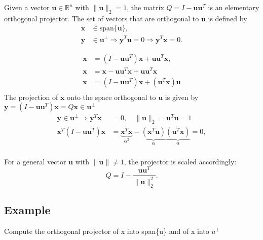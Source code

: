 Given a vector \( \mathbf{u} \in \mathbb{R}^n \) with \( \| \mathbf{u} \|_2 = 1 \), the matrix \( Q = I - \mathbf{u}\mathbf{u}^T \) is an elementary orthogonal projector. The set of vectors that are orthogonal to \( \mathbf{u} \) is defined by
\begin{align*}
\mathbf{x} &\in \text{span}\{ \mathbf{u} \}, \\
\mathbf{y} &\in \mathbf{u}^\perp \Rightarrow \mathbf{y}^T\mathbf{u} = 0 \Rightarrow \mathbf{y}^T\mathbf{x} = 0.
\end{align*}

\begin{align*}
\mathbf{x} &= (I - \mathbf{u}\mathbf{u}^T)\mathbf{x} + \mathbf{u}\mathbf{u}^T\mathbf{x}, \\
\mathbf{x} &= \mathbf{x}  - \mathbf{u}\mathbf{u}^T\mathbf{x} + \mathbf{u}\mathbf{u}^T\mathbf{x} \\
\mathbf{x} &= (I - \mathbf{u}\mathbf{u}^T)\mathbf{x} + (\mathbf{u}^T\mathbf{x})\mathbf{u} \\
\end{align*}
The projection of \( \mathbf{x} \) onto the space orthogonal to \( \mathbf{u} \) is given by \( \mathbf{y} = (I - \mathbf{u}\mathbf{u}^T)\mathbf{x} = Q\mathbf{x} \in \mathbf{u}^\perp \)
\begin{align*}
\mathbf{y} \in \mathbf{u}^\perp \Rightarrow \mathbf{y}^T \mathbf{x} &= 0, \quad \| \mathbf{u} \|_2 = \mathbf{u}^T\mathbf{u} = 1 \\
\mathbf{x}^T(I - \mathbf{u}\mathbf{u}^T)\mathbf{x} &= \underbrace{\mathbf{x}^T\mathbf{x}}_{\alpha^2} - \underbrace{(\mathbf{x}^T\mathbf{u})}_{\alpha}\underbrace{(\mathbf{u}^T\mathbf{x})}_{\alpha} = 0, \\
\end{align*}

For a general vector \( \mathbf{u} \) with \( \| \mathbf{u} \| \neq 1 \), the projector is scaled accordingly:
\begin{equation*}
Q = I - \frac{\mathbf{u}\mathbf{u}^T}{\| \mathbf{u} \|_2^2}.
\end{equation*}

\subsection*{Example}
Compute the orthogonal projector of x into span\{u\} and of x into $u^\perp$

